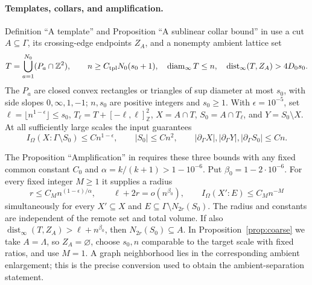 \documentclass[11pt]{article}
\numberwithin{equation}{section}
\theoremstyle{definition}
\theoremstyle{remark}
\begin{document}
\paragraph{Templates, collars, and amplification.}
Definition ``A template'' and Proposition ``A sublinear collar bound'' in
\cite[Section~9]{RepoAreaLaw} use a cut $A\subseteq\Gamma$, its crossing-edge
endpoints $Z_A$, and a nonempty ambient lattice set
\[
 T=\bigcup_{a=1}^{N_0}(P_a\cap\mathbb Z^2),\qquad
 n\ge C_{\rm tpl}N_0(s_0+1),\quad \operatorname{diam}_\infty T\le n,
 \quad \operatorname{dist}_\infty(T,Z_A)>4D_0s_0.
\]
The $P_a$ are closed convex rectangles or triangles of sup diameter at most
$s_0$, with side slopes $0,\infty,1,-1$; $n,s_0$ are positive integers and
$s_0\ge1$. With $\epsilon=10^{-5}$, set
$\ell=\lfloor n^{1-\epsilon}\rfloor\le s_0$,
$T_\ell=T+[-\ell,\ell]^2_{\mathbb Z}$, $X=A\cap T$,
$S_0=A\cap T_\ell$, and $Y=S_0\setminus X$.
At all sufficiently large scales the input guarantees
\[
 I_\Omega(X:\Gamma\setminus S_0)\le Cn^{1-\epsilon},\qquad
 |S_0|\le Cn^2,\qquad
 |\partial_\Gamma X|,|\partial_\Gamma Y|,|\partial_\Gamma S_0|\le Cn.
\]

The Proposition ``Amplification'' in \cite[Section~10]{RepoAreaLaw}
requires these three bounds with any fixed common constant $C_0$ and
$\alpha=k/(k+1)>1-10^{-6}$. Put $\beta_0=1-2\cdot10^{-6}$.
For every fixed integer $M\ge1$ it supplies a radius
\[
 r\le C_M n^{(1-\epsilon)/\alpha},\qquad
 \ell+2r=o(n^{\beta_0}),\qquad
 I_\Omega(X':E)\le C_M n^{-M}
\]
simultaneously for every $X'\subseteq X$ and
$E\subseteq\Gamma\setminus N_{2r}(S_0)$. The radius and constants are
independent of the remote set and total volume. If also
$\operatorname{dist}_\infty(T,Z_A)>\ell+n^{\beta_0}$, then
$N_{2r}(S_0)\subseteq A$. In Proposition~\ref{prop:coarse} we take
$A=\Lambda$, so $Z_A=\varnothing$, choose $s_0,n$ comparable to the target
scale with fixed ratios, and use $M=1$. A graph neighborhood lies in the
corresponding ambient enlargement; this is the precise conversion used to
obtain the ambient-separation statement.
\end{document}
